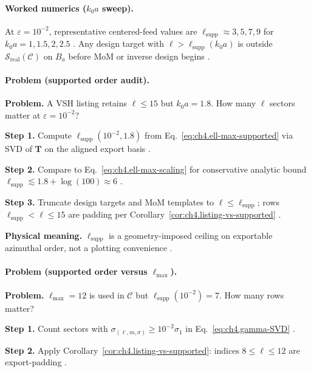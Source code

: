 \paragraph{Worked numerics (\(k_{0}a\) sweep).}
At \(\varepsilon=10^{-2}\), representative centered-feed values are \(\ell_{\mathrm{supp}}\approx3,5,7,9\) for
\(k_{0}a=1,1.5,2,2.5\) \cite{hansen1988,harrington2001}. Any design target with \(\ell>\ell_{\mathrm{supp}}(k_{0}a)\) is outside
\(\mathcal{S}_{\mathrm{real}}(\mathcal{C})\) on \(B_{a}\) before MoM or inverse design begins \cite{stratton1941,devaney2004}.

\paragraph{Problem (supported order audit).}
\textbf{Problem.} A VSH listing retains \(\ell\le15\) but \(k_{0}a=1.8\). How many \(\ell\) sectors matter at \(\varepsilon=10^{-2}\)?

\textbf{Step 1.} Compute \(\ell_{\mathrm{supp}}(10^{-2},1.8)\) from Eq.~\eqref{eq:ch4.ell-max-supported} via SVD of \(\mathbf{T}\) on the
aligned export basis \cite{harrington2001}.

\textbf{Step 2.} Compare to Eq.~\eqref{eq:ch4.ell-max-scaling} for conservative analytic bound \(\ell_{\mathrm{supp}}\lesssim1.8+\log(100)\approx6\)
\cite{hansen1988,jackson1999}.

\textbf{Step 3.} Truncate design targets and MoM templates to \(\ell\le\ell_{\mathrm{supp}}\); rows \(\ell_{\mathrm{supp}}<\ell\le15\) are
padding per Corollary~\ref{cor:ch4.listing-vs-supported} \cite{devaney2004,stratton1941}.

\textbf{Physical meaning.} \(\ell_{\mathrm{supp}}\) is a geometry-imposed ceiling on exportable azimuthal order, not a plotting convenience
\cite{hansen1988}.

\paragraph{Problem (supported order versus \(\ell_{\max}\)).}
\textbf{Problem.} \(\ell_{\max}=12\) is used in \(\mathcal{C}\) but \(\ell_{\mathrm{supp}}(10^{-2})=7\). How many rows matter?

\textbf{Step 1.} Count sectors with \(\sigma_{(\ell,m,\sigma)}\ge10^{-2}\sigma_{1}\) in Eq.~\eqref{eq:ch4.gamma-SVD} \cite{harrington2001}.

\textbf{Step 2.} Apply Corollary~\ref{cor:ch4.listing-vs-supported}: indices \(8\le\ell\le12\) are export-padding \cite{hansen1988,stratton1941}.

